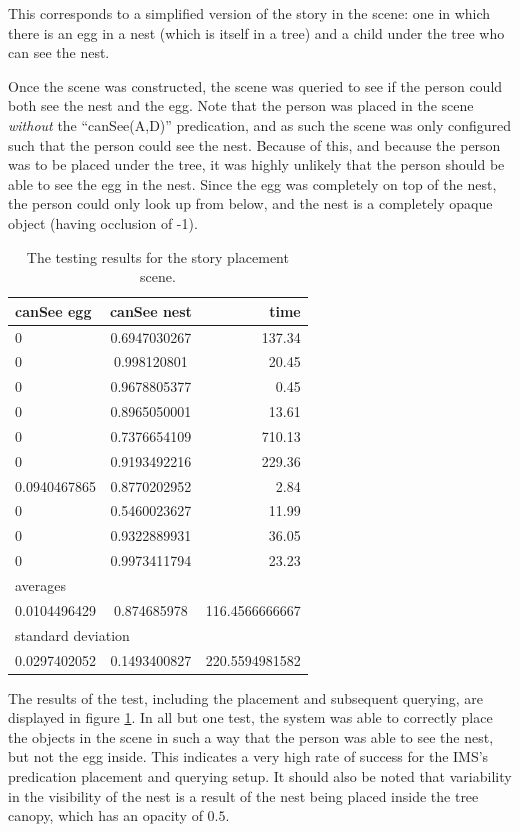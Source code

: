 This corresponds to a simplified version of the story in the scene: one in which there is an egg in a nest (which is itself in a tree) and a child under the tree who can see the nest. 

Once the scene was constructed, the scene was queried to see if the person could both see the nest and the egg. Note that the person was placed in the scene \emph{without} the ``canSee(A,D)'' predication, and as such the scene was only configured such that the person could see the nest.
Because of this, and because the person was to be placed under the tree, it was highly unlikely that the person should be able to see the egg in the nest. Since the egg was completely on top of the nest, the person could only look up from below, and the nest is a completely opaque object (having occlusion of -1).

\begin{table}[h]
	\centering
	\begin{tabular}{|l c r|}
		\hline
		canSee egg&	canSee nest&	time\\\hline
		0&	0.6947030267&	137.34\\
		0&	0.998120801&	20.45\\
		0&	0.9678805377&	0.45\\
		0&	0.8965050001&	13.61\\
		0&	0.7376654109&	710.13\\
		0&	0.9193492216&	229.36\\
		0.0940467865&	0.8770202952&	2.84\\
		0&	0.5460023627&	11.99\\
		0&	0.9322889931&	36.05\\
		0&	0.9973411794&	23.23\\
		\hline\hline
		\multicolumn{3}{|l|}{averages}\\		
		0.0104496429&	0.874685978&	116.4566666667 \\\hline
		\multicolumn{3}{|l|}{standard deviation} \\
		0.0297402052&	0.1493400827&	220.5594981582
		\\\hline
	\end{tabular}
	\caption{The testing results for the story placement scene.}
	\label{table:story_placements}
\end{table}
The results of the test, including the placement and subsequent querying, are displayed in figure \ref{table:story_placements}. In all but one test, the system was able to correctly place the objects in the scene in such a way that the person was able to see the nest, but not the egg inside. This indicates a very high rate of success for the IMS's predication placement and querying setup. It should also be noted that variability in the visibility of the nest is a result of the nest being placed inside the tree canopy, which has an opacity of $0.5$.
